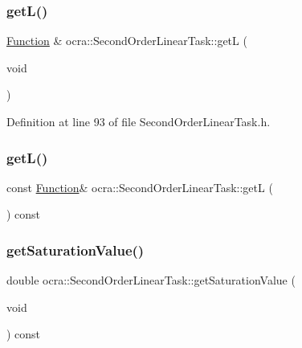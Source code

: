 \subsubsection{\texorpdfstring{get\+L()}{getL()}\hspace{0.1cm}{\footnotesize\ttfamily [1/2]}}
{\footnotesize\ttfamily \hyperlink{classocra_1_1Function}{Function} \& ocra\+::\+Second\+Order\+Linear\+Task\+::getL (\begin{DoxyParamCaption}\item[{void}]{ }\end{DoxyParamCaption})\hspace{0.3cm}{\ttfamily [inline]}}



Definition at line 93 of file Second\+Order\+Linear\+Task.\+h.

\hypertarget{classocra_1_1SecondOrderLinearTask_ac0b4bce5cc4bb7648c7585750c3bebbb}{}\label{classocra_1_1SecondOrderLinearTask_ac0b4bce5cc4bb7648c7585750c3bebbb} 
\subsubsection{\texorpdfstring{get\+L()}{getL()}\hspace{0.1cm}{\footnotesize\ttfamily [2/2]}}
{\footnotesize\ttfamily const \hyperlink{classocra_1_1Function}{Function}\& ocra\+::\+Second\+Order\+Linear\+Task\+::getL (\begin{DoxyParamCaption}{ }\end{DoxyParamCaption}) const}

\hypertarget{classocra_1_1SecondOrderLinearTask_ab36774d979e6930e5bb56bb9fe913667}{}\label{classocra_1_1SecondOrderLinearTask_ab36774d979e6930e5bb56bb9fe913667} 
\subsubsection{\texorpdfstring{get\+Saturation\+Value()}{getSaturationValue()}}
{\footnotesize\ttfamily double ocra\+::\+Second\+Order\+Linear\+Task\+::get\+Saturation\+Value (\begin{DoxyParamCaption}\item[{void}]{ }\end{DoxyParamCaption}) const\hspace{0.3cm}{\ttfamily [inline]}}



